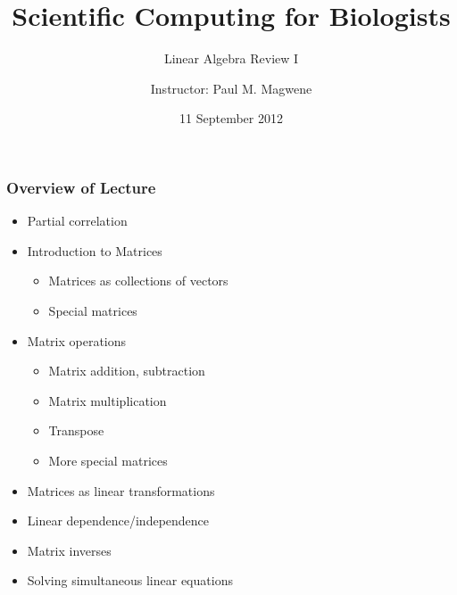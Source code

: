 \documentclass{beamer}
\title{Scientific Computing for Biologists}
\subtitle{Linear Algebra Review I} %
\author{Instructor: Paul M. Magwene}
\date{11 September 2012}
\begin{document}
\begin{frame}
\titlepage
\end{frame}

\begin{frame}
  \frametitle{Overview of Lecture}
  
\begin{itemize}
        \item Partial correlation
		\item Introduction to Matrices
		\begin{itemize}
			\item Matrices as collections of vectors
			\item Special matrices
		\end{itemize}
		\item Matrix operations
		\begin{itemize}
			\item Matrix addition, subtraction
			\item Matrix multiplication
		  \item Transpose			
		  \item More special matrices		  
		\end{itemize}		
	  \item Matrices as linear transformations		
		\item Linear dependence/independence
		\item Matrix inverses		
		\item Solving simultaneous linear equations
\end{itemize}

\end{frame}
\end{document}
